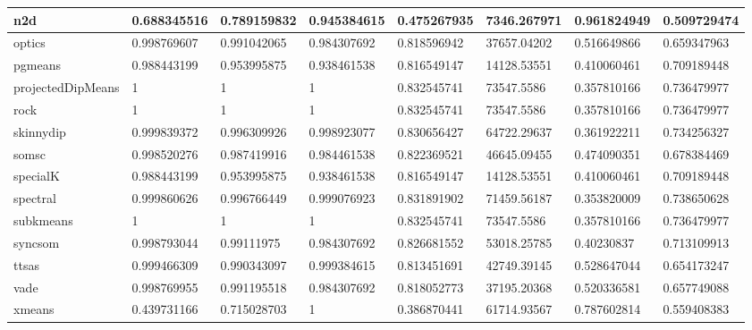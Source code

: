 \begin{table}[H]
\begin{tabular}{|l|l|l|l|l|l|l|l|}
\hline
n2d & 0.688345516 & 0.789159832 & 0.945384615 & 0.475267935 & 7346.267971 & 0.961824949 & 0.509729474 \\
\hline
optics & 0.998769607 & 0.991042065 & 0.984307692 & 0.818596942 & 37657.04202 & 0.516649866 & 0.659347963 \\
\hline
pgmeans & 0.988443199 & 0.953995875 & 0.938461538 & 0.816549147 & 14128.53551 & 0.410060461 & 0.709189448 \\
\hline
projectedDipMeans & 1 & 1 & 1 & 0.832545741 & 73547.5586 & 0.357810166 & 0.736479977 \\
\hline
rock & 1 & 1 & 1 & 0.832545741 & 73547.5586 & 0.357810166 & 0.736479977 \\
\hline
skinnydip & 0.999839372 & 0.996309926 & 0.998923077 & 0.830656427 & 64722.29637 & 0.361922211 & 0.734256327 \\
\hline
somsc & 0.998520276 & 0.987419916 & 0.984461538 & 0.822369521 & 46645.09455 & 0.474090351 & 0.678384469 \\
\hline
specialK & 0.988443199 & 0.953995875 & 0.938461538 & 0.816549147 & 14128.53551 & 0.410060461 & 0.709189448 \\
\hline
spectral & 0.999860626 & 0.996766449 & 0.999076923 & 0.831891902 & 71459.56187 & 0.353820009 & 0.738650628 \\
\hline
subkmeans & 1 & 1 & 1 & 0.832545741 & 73547.5586 & 0.357810166 & 0.736479977 \\
\hline
syncsom & 0.998793044 & 0.99111975 & 0.984307692 & 0.826681552 & 53018.25785 & 0.40230837 & 0.713109913 \\
\hline
ttsas & 0.999466309 & 0.990343097 & 0.999384615 & 0.813451691 & 42749.39145 & 0.528647044 & 0.654173247 \\
\hline
vade & 0.998769955 & 0.991195518 & 0.984307692 & 0.818052773 & 37195.20368 & 0.520336581 & 0.657749088 \\
\hline
xmeans & 0.439731166 & 0.715028703 & 1 & 0.386870441 & 61714.93567 & 0.787602814 & 0.559408383 \\
\hline
\end{tabular}
\end{table}